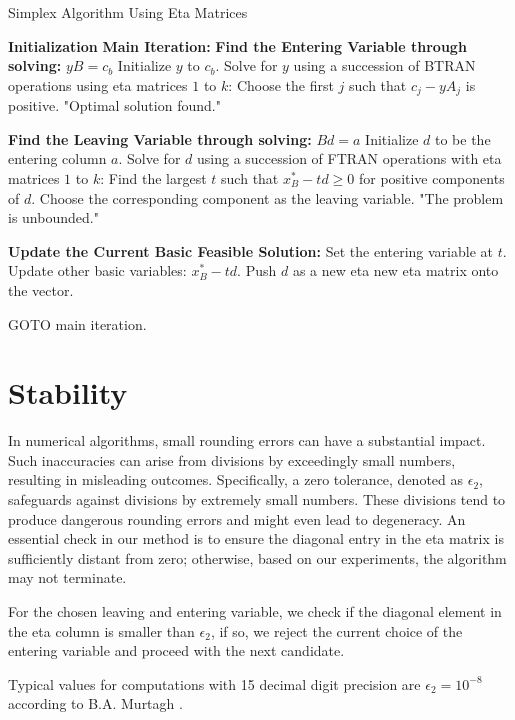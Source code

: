 \begin{algorithm}
    \caption{Simplex Algorithm Using Eta Matrices}
    \begin{algorithmic}
        \State \textbf{Initialization}
        \State \textbf{Main Iteration:}
        \State \textbf{Find the Entering Variable through solving:} $yB = c_b$
        \State Initialize \(y\) to \(c_b\).
        \State Solve for \(y\) using a succession of BTRAN operations using
        eta matrices \(1\) to \(k\):
        \State Choose the first \(j\) such that \(c_j - yA_j\) is positive.
        \State \Return "Optimal solution found."
        \EndIf

        \State \textbf{Find the Leaving Variable through solving:} $Bd =a$
        \State Initialize \(d\) to be the entering column $a$.
        \State Solve for \(d\) using a succession of FTRAN operations with
        eta matrices \(1\) to \(k\):
        \State Find the largest $t$ such that \( x_B^{\ast} - td \geq 0\) 
        for positive components of $d$. Choose the corresponding component as the leaving variable.
        \State \Return "The problem is unbounded."
        \EndIf

        \State \textbf{Update the Current Basic Feasible Solution:}
        \State Set the entering variable at \(t\).
        \State Update other basic variables: \(x^*_B - td\).
        \State Push \(d\) as a new eta new eta matrix onto the vector.

        \State GOTO main iteration.
    \end{algorithmic}
\end{algorithm}
\section{Stability}
In numerical algorithms, small rounding errors can have a substantial impact. 
Such inaccuracies can arise from divisions by exceedingly small numbers, 
resulting in misleading outcomes.
Specifically, a zero tolerance, denoted as $\epsilon_2$, safeguards against divisions
 by extremely small numbers. These divisions tend to produce dangerous rounding errors
  and might even lead to degeneracy. An essential check in our method is to 
  ensure the diagonal entry in the eta matrix is sufficiently distant from zero; 
  otherwise, based on our experiments, the algorithm may not terminate. 

For the chosen leaving and entering variable, 
we check if the diagonal element in the eta column is smaller than $\epsilon_2$, if so,
we reject the current choice of the entering variable and proceed with the next candidate.

Typical values for computations with 15 decimal digit precision are $\epsilon_2 = 10^{-8}$
according to B.A. Murtagh \parencite{murtagh1981advanced}. 


